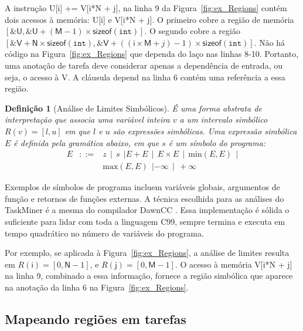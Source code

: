\documentclass[sigplan,10pt,review]{acmart}
\newcommand\dawn{\mbox{\textsf{DawnCC}}}
\newcommand\Taskminer{\mbox{\textsf{TaskMiner}}}
\newtheorem{Definicao}{Defini\c{c}\~{a}o}
\begin{document}
A instrução \textsf{U[i] += V[i*N + j]}, na linha 9 da Figura~\ref{fig:ex_Regions}
contém dois acessos à memória: \textsf{U[i]} e
\textsf{V[i*N + j]}.
 O primeiro cobre a região de memória $[\mathtt{\&}\mathsf{U},
\mathtt{\&}\mathsf{U} + (\mathsf{M} - 1) \times \mathsf{sizeof}(\mathtt{int})]$.
O segundo cobre a região 
$[\mathtt{\&}\mathsf{V} + \mathsf{N} \times \mathsf{sizeof}(\mathtt{int}), \mathtt{\&}\mathsf{V} + ((\mathsf{i} \times \mathsf{M} + j) - 1) \times \mathsf{sizeof}(\mathtt{int})]$.
Não há código na Figura~\ref{fig:ex_Regions} que dependa do laço nas linhas 8-10.
Portanto, uma anotação de tarefa deve considerar apenas a dependência de entrada, ou seja,
o acesso à \textsf{V}. A cláusula \textsf{depend} na linha 6 contém uma referência
a essa região.

\begin{Definicao} [Análise de Limites Simbólicos]
\label{def:limites}
É uma forma abstrata de interpretação que associa uma variável inteira $v$
a um intervalo simbólico $R(v) = [l, u]$ em que $l$ e $u$ são expressões simbólicas.
Uma expressão simbólica $E$ é definida pela gramática abaixo, em que $s$ é um 
símbolo do programa:
\renewcommand{\arraystretch}{0.9}
\[
\begin{array}{rcl}
E & ::= & z \ \ | \ \ s \ \ | E + E \ \ | \ \ E \times E \ \ | \ \  \mbox{min}(E, E) \ \ | \\
&  & \mbox{max}(E, E) \ \ | -\infty \ \ | \ \ +\infty
\end{array}
\]
\end{Definicao}

Exemplos de símbolos de programa incluem variáveis globais, argumentos de função e retornos de
funções externas. A técnica
escolhida para as análises do {\Taskminer} é a mesma do compilador \dawn{} \cite{Mendonca17}.
Essa implementação é sólida o suficiente para lidar com toda a linguagem C99, sempre termina
e executa em tempo quadrático no número de variáveis do programa.

Por exemplo, se aplicada à Figura~\ref{fig:ex_Regions}, a análise de limites resulta em 
$R(\mathsf{i}) = [0, \mathsf{N} - 1]$, e $R(\mathsf{j}) = [0, \mathsf{M} - 1]$.
O acesso à memória \textsf{V[i*N + j]} na linha 9, combinado a essa informação, fornece
a região simbólica que aparece na anotação da linha 6 na Figura~\ref{fig:ex_Regions}.

\subsection{Mapeando regiões em tarefas}
\label{sub:identification}
\end{document}
